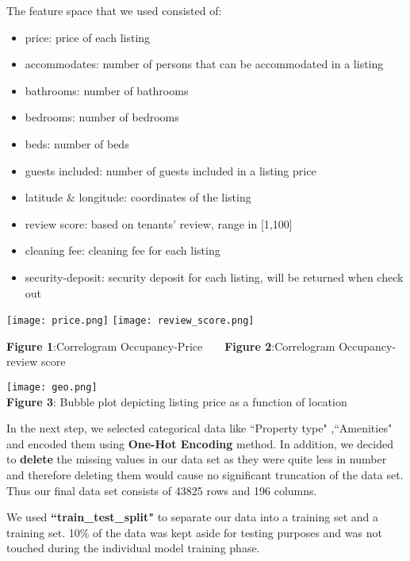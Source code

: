 \documentclass[12pt]{article}
\begin{document}
\noindent The feature space that we used consisted of:
\begin{itemize}

\item price: price of each listing
\item accommodates: number of persons that can be accommodated in a listing
\item bathrooms: number of bathrooms
\item bedrooms: number of bedrooms
\item beds: number of beds
\item guests included: number of guests included in a listing price
\item latitude \& longitude: coordinates of the listing
\item review score: based on tenants' review, range in [1,100]
\item cleaning fee: cleaning fee for each listing
\item security-deposit: security deposit for each listing, will be returned when check out
\end{itemize}

\noindent 

\begin{center}
\texttt{[image: price.png]}
\texttt{[image: review\_score.png]}
\end{center}
\textbf{Figure 1}:Correlogram Occupancy-Price 
\,\,\,\,\,\,\,\,
   \textbf{Figure 2}:Correlogram Occupancy-review score


\begin{center}
\texttt{[image: geo.png]}
\\\textbf{Figure 3}: Bubble plot depicting listing price as a function of location
\end{center}

\noindent In the next step, we selected categorical data like ``Property type" ,``Amenities" and encoded them using \textbf{One-Hot Encoding} method. In addition, we decided to \textbf{delete} the missing values in our data set as they were quite less in number and therefore deleting them would cause no significant truncation of the data set. Thus our final data set consists of 43825 rows and 196 columns.   


\noindent We used \textbf{``train\_test\_split"} to separate our data into a training set and a training set. 10\% of the data was kept aside for testing purposes and was not touched during the individual model training phase.
\end{document}
